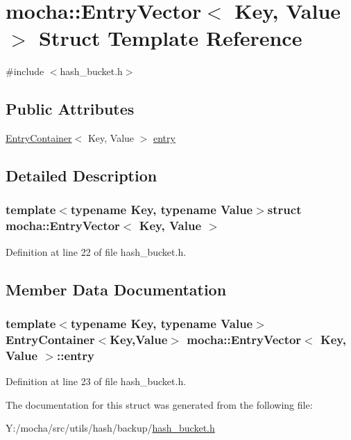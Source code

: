 \hypertarget{structmocha_1_1_entry_vector}{
\section{mocha::EntryVector$<$ Key, Value $>$ Struct Template Reference}
\label{structmocha_1_1_entry_vector}
}


{\ttfamily \#include $<$hash\_\-bucket.h$>$}

\subsection*{Public Attributes}
\begin{DoxyCompactItemize}
\item 
\hyperlink{classmocha_1_1_entry_container}{EntryContainer}$<$ Key, Value $>$ \hyperlink{structmocha_1_1_entry_vector_a992d1efe43c0566288209f0b6dda1df6}{entry}
\end{DoxyCompactItemize}


\subsection{Detailed Description}
\subsubsection*{template$<$typename Key, typename Value$>$struct mocha::EntryVector$<$ Key, Value $>$}



Definition at line 22 of file hash\_\-bucket.h.



\subsection{Member Data Documentation}
\hypertarget{structmocha_1_1_entry_vector_a992d1efe43c0566288209f0b6dda1df6}{
\subsubsection[{entry}]{\setlength{\rightskip}{0pt plus 5cm}template$<$typename Key, typename Value$>$ {\bf EntryContainer}$<$Key,Value$>$ {\bf mocha::EntryVector}$<$ Key, Value $>$::{\bf entry}}}
\label{structmocha_1_1_entry_vector_a992d1efe43c0566288209f0b6dda1df6}


Definition at line 23 of file hash\_\-bucket.h.



The documentation for this struct was generated from the following file:\begin{DoxyCompactItemize}
\item 
Y:/mocha/src/utils/hash/backup/\hyperlink{backup_2hash__bucket_8h}{hash\_\-bucket.h}\end{DoxyCompactItemize}
